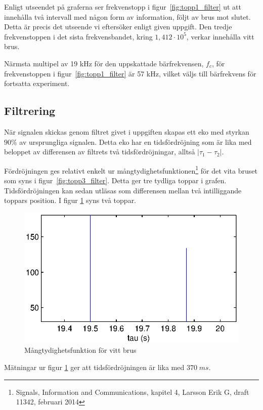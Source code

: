\documentclass[10pt,twocolumn]{article}
\begin{document}
Enligt utseendet på graferna ser frekvenstopp i figur~\ref{fig:topp1_filter} ut att innehålla två intervall med någon form av information, följt av brus mot slutet. Detta är precis det utseende vi eftersöker enligt given uppgift. Den tredje frekvenstoppen i det sista frekvensbandet, kring $1,412 \cdot 10^5$, verkar innehålla vitt brus. 

Närmsta multipel av 19 kHz för den uppskattade bärfrekvensen, $f_c$, för frekvenstoppen i figur~\ref{fig:topp1_filter} är 57 kHz, vilket väljs till bärfrekvens för fortsatta experiment. 

\subsection{Filtrering}

När signalen skickas genom filtret givet i uppgiften skapas ett eko med styrkan $90\%$ av ursprungliga signalen. Detta eko har en tidsfördröjning som är lika med beloppet av differensen av filtrets två tidsfördröjningar, alltså $|\tau_1 - \tau_2|$.

Fördröjningen ges relativt enkelt ur mångtydighetsfunktionen\footnote{Signals, Information and Communications, kapitel 4, Larsson Erik G, draft 11342, februari 2014} för det vita bruset som syns i figur~\ref{fig:topp3_filter}. Detta ger tre tydliga toppar i grafen. Tidsfördröjningen kan sedan utläsas som differensen mellan två intilliggande toppars position. I figur \ref{fig:xCorr} syns två toppar.  
\begin{figure}[htp]
  \begin{center}
  \includegraphics[keepaspectratio=true,width=\linewidth]{xCorr.eps}  %
  \end{center}
  \caption{Mångtydighetsfunktion för vitt brus} %
  \label{fig:xCorr}
\end{figure}
Mätningar ur figur \ref{fig:xCorr} ger att tidsfördröjningen är lika med $370\;ms$. 
\end{document}
